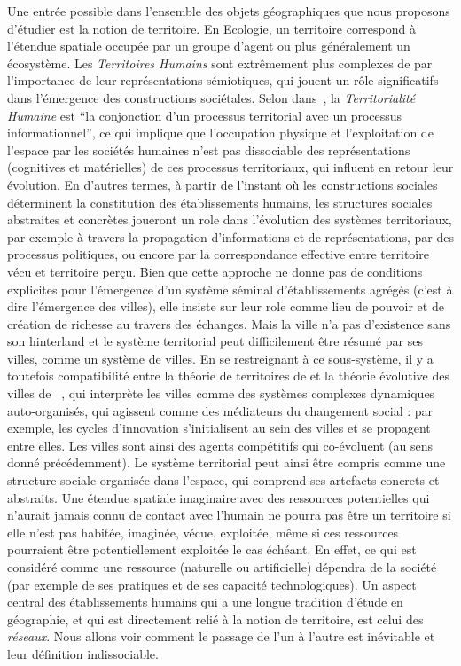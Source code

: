 {}{
Une entrée possible dans l'ensemble des objets géographiques que nous proposons d'étudier est la notion de territoire. En Ecologie, un territoire correspond à l'étendue spatiale occupée par un groupe d'agent ou plus généralement un écosystème. Les \emph{Territoires Humains} sont extrêmement plus complexes de par l'importance de leur représentations sémiotiques, qui jouent un rôle significatifs dans l'émergence des constructions sociétales. Selon  dans~\cite{raffestin1988reperes}, la \emph{Territorialité Humaine} est ``la conjonction d'un processus territorial avec un processus informationnel'', ce qui implique que l'occupation physique et l'exploitation de l'espace par les sociétés humaines n'est pas dissociable des représentations (cognitives et matérielles) de ces processus territoriaux, qui influent en retour leur évolution. En d'autres termes, à partir de l'instant où les constructions sociales déterminent la constitution des établissements humains, les structures sociales abstraites et concrètes joueront un role dans l'évolution des systèmes territoriaux, par exemple à travers la propagation d'informations et de représentations, par des processus politiques, ou encore par la correspondance effective entre territoire vécu et territoire perçu. Bien que cette approche ne donne pas de conditions explicites pour l'émergence d'un système séminal d'établissements agrégés (c'est à dire l'émergence des villes), elle insiste sur leur role comme lieu de pouvoir et de création de richesse au travers des échanges. Mais la ville n'a pas d'existence sans son hinterland et le système territorial peut difficilement être résumé par ses villes, comme un système de villes. En se restreignant à ce sous-système, il y a toutefois compatibilité entre la théorie de territoires de  et la théorie évolutive des villes de ~\cite{pumain2010theorie}, qui interprète les villes comme des systèmes complexes dynamiques auto-organisés, qui agissent comme des médiateurs du changement social : par exemple, les cycles d'innovation s'initialisent au sein des villes et se propagent entre elles. Les villes sont ainsi des agents compétitifs qui co-évoluent (au sens donné précédemment). Le système territorial peut ainsi être compris comme une structure sociale organisée dans l'espace, qui comprend ses artefacts concrets et abstraits. Une étendue spatiale imaginaire avec des ressources potentielles qui n'aurait jamais connu de contact avec l'humain ne pourra pas être un territoire si elle n'est pas habitée, imaginée, vécue, exploitée, même si ces ressources pourraient être potentiellement exploitée le cas échéant. En effet, ce qui est considéré comme une ressource (naturelle ou artificielle) dépendra de la société (par exemple de ses pratiques et de ses capacité technologiques). Un aspect central des établissements humains qui a une longue tradition d'étude en géographie, et qui est directement relié à la notion de territoire, est celui des \emph{réseaux}. Nous allons voir comment le passage de l'un à l'autre est inévitable et leur définition indissociable.
}


